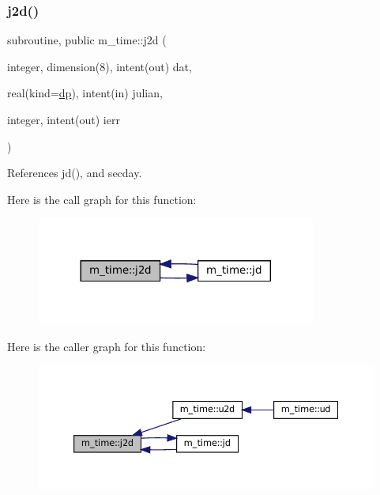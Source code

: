 \mbox{\label{namespacem__time_a4da84079c6587a8aaa8ef32169a84cc5}} 
\subsubsection{\texorpdfstring{j2d()}{j2d()}}
{\footnotesize\ttfamily subroutine, public m\+\_\+time\+::j2d (\begin{DoxyParamCaption}\item[{integer, dimension(8), intent(out)}]{dat,  }\item[{real(kind=\mbox{\hyperlink{namespacem__time_a95f16e7435244d114f0a451625dc189a}{dp}}), intent(in)}]{julian,  }\item[{integer, intent(out)}]{ierr }\end{DoxyParamCaption})}



References jd(), and secday.

Here is the call graph for this function\+:\nopagebreak
\begin{figure}[H]
\begin{center}
\leavevmode
\includegraphics[width=260pt]{namespacem__time_a4da84079c6587a8aaa8ef32169a84cc5_cgraph}
\end{center}
\end{figure}
Here is the caller graph for this function\+:\nopagebreak
\begin{figure}[H]
\begin{center}
\leavevmode
\includegraphics[width=350pt]{namespacem__time_a4da84079c6587a8aaa8ef32169a84cc5_icgraph}
\end{center}
\end{figure}
\mbox{\label{namespacem__time_a6c3297c41c6f58f8139c48466a37f292}} 
